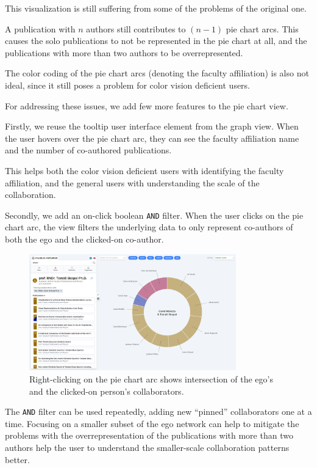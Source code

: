 This visualization is still suffering from some of the problems of the original one. 

A publication with $n$ authors still contributes to $(n-1)$ pie chart arcs. 
This causes the solo publications to not be represented in the pie chart at all, and the publications with more than two authors to be overrepresented.

The color coding of the pie chart arcs (denoting the faculty affiliation) is also not ideal, since it still poses a problem for color vision deficient users.

For addressing these issues, we add few more features to the pie chart view.

Firstly, we reuse the tooltip user interface element from the graph view. 
When the user hovers over the pie chart arc, they can see the faculty affiliation name and the number of co-authored publications.

This helps both the color vision deficient users with identifying the faculty affiliation, and the general users with understanding the scale of the collaboration.

Secondly, we add an on-click boolean \texttt{AND} filter. 
When the user clicks on the pie chart arc, the view filters the underlying data to only represent co-authors of both the ego and the clicked-on co-author.

\begin{figure}[ht!]
    \captionsetup{width=.9\linewidth}
    \includegraphics[width=0.8\textwidth]{../img/pie-chart-filter.png}
    \centering
    \caption{Right-clicking on the pie chart arc shows intersection of the ego's and the clicked-on person's collaborators.}
\end{figure}

The \texttt{AND} filter can be used repeatedly, adding new ``pinned'' collaborators one at a time.
Focusing on a smaller subset of the ego network can help to mitigate the problems with the overrepresentation of the publications with more than two authors
help the user to understand the smaller-scale collaboration patterns better.

